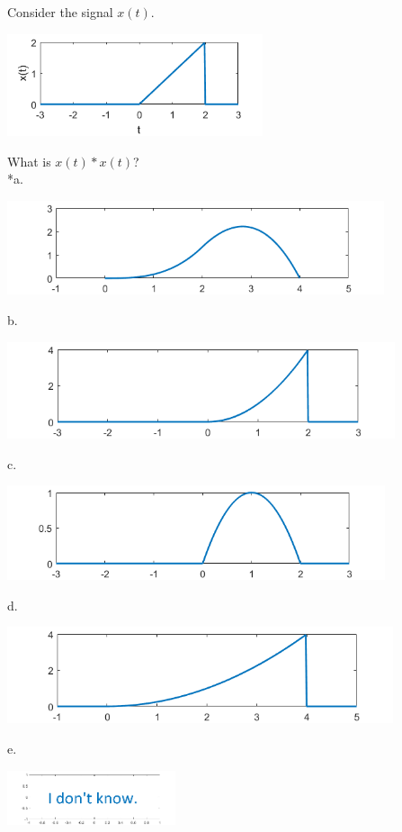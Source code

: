 
Consider the signal \(x(t)\).

\includegraphics[width=2.96021in,height=1.18267in]{../../Images/ConvolutionQ1.png}

What is \(x\left( t \right)*x(t)\)?\\

*a. 

\includegraphics[width=4.3604in,height=1.08836in]{../../Images/ConvolutionQ1a.png}

b. 

\includegraphics[width=4.49302in,height=1.12146in]{../../Images/ConvolutionQ1b.png}

c. 

\includegraphics[width=4.37183in,height=1.09121in]{../../Images/ConvolutionQ1c.png}

d. 

\includegraphics[width=4.46763in,height=1.11512in]{../../Images/ConvolutionQ1d.png}

e.

\includegraphics[width=1.94778in,height=0.63207in]{../../Images/AnswerEGraph.png}\\
